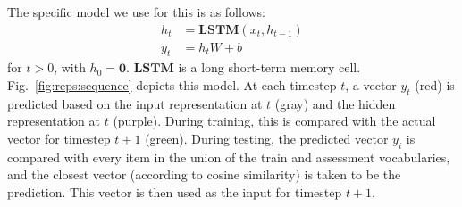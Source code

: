 \documentclass[12pt]{article}
\newcommand{\LSTM}{\textbf{LSTM}}
\newcommand{\Figref}[1]{Fig.~\ref{#1}}
\begin{document}
The specific model we use for this is as follows:
%
\begin{align}
  h_{t} &= \LSTM(x_{t}, h_{t-1}) \label{eq:lstm-recur}\\
  y_{t} &= h_{t}W + b\label{eq:lstm-predict}
\end{align}
%
for $t > 0$, with $h_{0} = \mathbf{0}$. $\LSTM$ is a long short-term memory cell. \Figref{fig:reps:sequence} depicts this model. At each timestep $t$, a vector $y_{t}$ (red) is predicted based on the input representation at $t$ (gray) and the hidden representation at $t$ (purple). During training, this is compared with the actual vector for timestep $t+1$ (green). During testing, the predicted vector $y_{i}$ is compared with every item in the union of the train and assessment vocabularies, and the closest vector (according to cosine similarity) is taken to be the prediction. This vector is then used as the input for timestep $t+1$.
\end{document}
